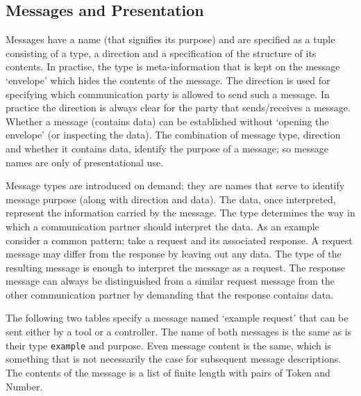 \documentclass{article}
\newcommand{\msg}[1]{\texttt{#1}}
\begin{document}
  \subsection{Messages and Presentation}

   Messages have a name (that signifies its purpose) and are specified as a
   tuple consisting of a type, a direction and a specification of the structure
   of its contents. In practise, the type is meta-information that is kept on
   the message `envelope' which hides the contents of the message. The
   direction is used for specifying which communication party is allowed to
   send such a message. In practice the direction is always clear for the party
   that sends/receives a message.  Whether a message (contains data) can be
   established without `opening the envelope' (or inspecting the data). The
   combination of message type, direction and whether it contains data, identify
   the purpose of a message; so message names are only of presentational use.
   
   Message types are introduced on demand; they are names that serve to
   identify message purpose (along with direction and data). The data, once
   interpreted, represent the information carried by the message. The type
   determines the way in which a communication partner should interpret the
   data. As an example consider a common pattern; take a request and its
   associated response. A request message may differ from the response by
   leaving out any data.  The type of the resulting message is enough to
   interpret the message as a request.  The response message can always be
   distinguished from a similar request message from the other communication
   partner by demanding that the response contains data.
   
   The following two tables specify a message named `example request' that can
   be sent either by a tool or a controller. The name of both messages is the
   same as is their type \msg{example} and purpose. Even message content is the
   same, which is something that is not necessarily the case for subsequent
   message descriptions. The contents of the message is a list of finite length
   with pairs of Token and Number.
\end{document}
